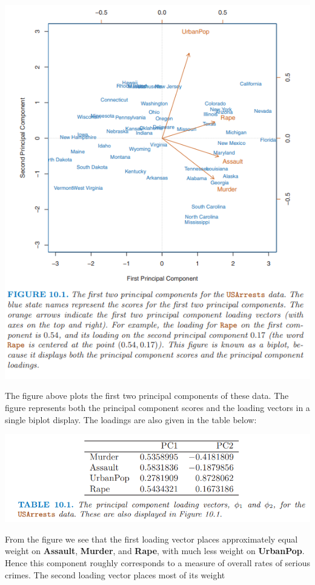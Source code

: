 \begin{center}
    \includegraphics[]{images/biplot.png}
\end{center}
The figure above plots the first two principal components of these data. The figure represents both the principal component scores and the loading vectors in a single biplot display. The loadings are also given in the table below: 
\begin{center}
    \includegraphics[scale=0.6]{images/table.png}
\end{center}
From the figure we see that the first loading vector places approximately
equal weight on \textbf{Assault}, \textbf{Murder}, and \textbf{Rape}, with much less weight on \textbf{UrbanPop}. Hence this component roughly corresponds to a measure of overall rates of serious crimes. The second loading vector places most of its weight
